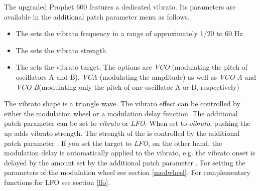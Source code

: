 The upgraded Prophet 600 features a dedicated vibrato. Its parameters are available in the additional patch parameter menu as follows.

\begin{itemize}
  \item The \vibspeed sets the vibrato frequency in a range of approximately 1/20 to 60 Hz
  \item The \vibamt sets the vibrato strength
  \item The \vibtgt sets the vibrato target. The options are \textit{VCO} (modulating the pitch of oscillators A  and B), \textit{VCA} (modulating the amplitude) as well as \textit{VCO A} and \textit{VCO B}(modulating only the pitch of one oscillator A  or  B, respectively)
\end{itemize}

The vibrato shape is a triangle wave. The vibrato effect can be controlled by either the modulation wheel or a modulation delay function. The additional patch parameter \modwheeltarget can be set to \textit{vibrato} or \textit{LFO}. When set to \textit{vibrato}, pushing the \modwheel up adds vibrato strength. The strength of the \modwheel is controlled by the additional patch parameter \modwheelrange. If you set the \modwheel target to \textit{LFO}, on the other hand, the modulation delay is automatically applied to the vibrato, e.g. the vibrato onset is delayed by the amount set by the additional patch parameter \moddelay. For setting the parameters of the modulation wheel see section \ref{modwheel}. For complementary functions for LFO see section \ref{lfo}.
